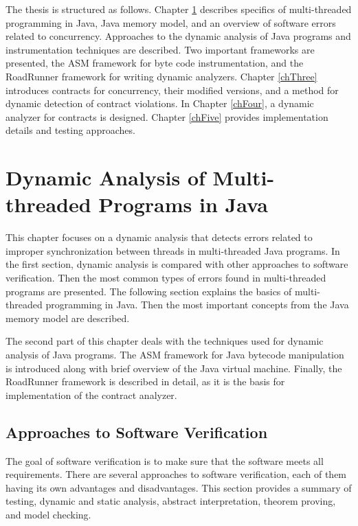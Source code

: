 The thesis is structured as follows. Chapter \ref{chTwo} describes specifics of
multi-threaded programming in Java, Java memory model, and an overview of
software errors related to concurrency. Approaches to the dynamic analysis of
Java programs and instrumentation techniques are described. Two important
frameworks are presented, the ASM framework for byte code instrumentation, and
the RoadRunner framework for writing dynamic analyzers. Chapter \ref{chThree}
introduces contracts for concurrency, their modified versions, and a method for
dynamic detection of contract violations. In Chapter \ref{chFour}, a dynamic
analyzer for contracts is designed. Chapter \ref{chFive} provides implementation
details and testing approaches.



\chapter{Dynamic Analysis of Multi-threaded Programs in Java}
\label{chTwo}

This chapter focuses on a dynamic analysis that detects errors related to
improper synchronization between threads in multi-threaded Java programs. In the
first section, dynamic analysis is compared with other approaches to software
verification. Then the most common types of errors found in multi-threaded
programs are presented. The following section explains the basics of
multi-threaded programming in Java. Then the most important concepts from the
Java memory model are described.

The second part of this chapter deals with the techniques used for dynamic
analysis of Java programs. The ASM framework for Java bytecode manipulation is
introduced along with brief overview of the Java virtual machine. Finally, the
RoadRunner framework is described in detail, as it is the basis for
implementation of the contract analyzer.


\section{Approaches to Software Verification}
\label{approachesToSwVerification}

The goal of software verification is to make sure that the software meets all
requirements. There are several approaches to software verification, each of
them having its own advantages and disadvantages. This section provides a
summary of testing, dynamic and static analysis, abstract interpretation,
theorem proving, and model checking.

